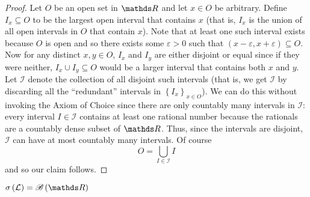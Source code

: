 \begin{proof}
Let $O$ be an open set in $\R$ and let $x\in O$ be arbitrary. Define
$I_{x}\subseteq O$ to be the largest open interval that contains
$x$ (that is, $I_{x}$ is the union of all open intervals in $O$
that contain $x$). Note that at least one such interval exists because
$O$ is open and so there exists some $\varepsilon>0$ such that $\left(x-\varepsilon,x+\varepsilon\right)\subseteq O.$
Now for any distinct $x,y\in O$, $I_{x}$ and $I_{y}$ are either
disjoint or equal since if they were neither, $I_{x}\cup I_{y}\subseteq O$
would be a larger interval that contains both $x$ and $y$. Let $\mathcal{I}$
denote the collection of all disjoint such intervals (that is, we
get $\mathcal{I}$ by discarding all the ``redundant'' intervals
in $\left\{ I_{x}\right\} _{x\in O}$). We can do this without invoking
the Axiom of Choice since there are only countably many intervals
in $\mathcal{I}$: every interval $I\in\mathcal{I}$ contains at least
one rational number because the rationals are a countably dense subset
of $\R$. Thus, since the intervals are disjoint, $\mathcal{I}$ can
have at most countably many intervals. Of course
\[
O=\bigcup_{I\in\mathcal{I}}I
\]
and so our claim follows.
\end{proof}
\begin{prop}
\label{prop:sigmaAlgebraGeneratedbyLisBorel}$\sigma\left(\mathcal{L}\right)=\borel\left(\R\right)$
\end{prop}


